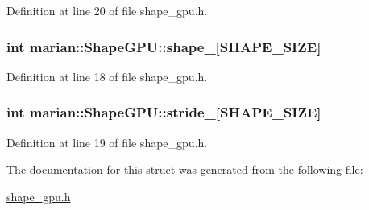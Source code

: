 Definition at line 20 of file shape\+\_\+gpu.\+h.

\subsubsection[{\texorpdfstring{shape\+\_\+}{shape_}}]{\setlength{\rightskip}{0pt plus 5cm}int marian\+::\+Shape\+G\+P\+U\+::shape\+\_\+\mbox{[}{\bf S\+H\+A\+P\+E\+\_\+\+S\+I\+ZE}\mbox{]}}\hypertarget{structmarian_1_1ShapeGPU_a13380b3887523932f3a300e0e3adc57b}{}\label{structmarian_1_1ShapeGPU_a13380b3887523932f3a300e0e3adc57b}


Definition at line 18 of file shape\+\_\+gpu.\+h.

\subsubsection[{\texorpdfstring{stride\+\_\+}{stride_}}]{\setlength{\rightskip}{0pt plus 5cm}int marian\+::\+Shape\+G\+P\+U\+::stride\+\_\+\mbox{[}{\bf S\+H\+A\+P\+E\+\_\+\+S\+I\+ZE}\mbox{]}}\hypertarget{structmarian_1_1ShapeGPU_a1e701422755ceccd83ce44a01fce4845}{}\label{structmarian_1_1ShapeGPU_a1e701422755ceccd83ce44a01fce4845}


Definition at line 19 of file shape\+\_\+gpu.\+h.



The documentation for this struct was generated from the following file\+:\begin{DoxyCompactItemize}
\item 
\hyperlink{shape__gpu_8h}{shape\+\_\+gpu.\+h}\end{DoxyCompactItemize}
